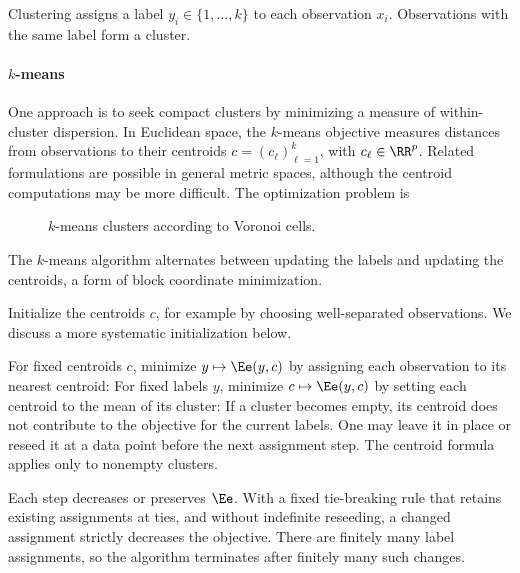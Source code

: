 Clustering assigns a label $y_i \in \{1,\ldots,k\}$ to each observation $x_i$. Observations with the same label form a cluster.

    
\paragraph{\texorpdfstring{$k$}{k}-means}

One approach is to seek compact clusters by minimizing a measure of within-cluster dispersion. In Euclidean space, the $k$-means objective measures distances from observations to their centroids $c=(c_\ell)_{\ell=1}^k$, with $c_\ell \in \RR^p$. Related formulations are possible in general metric spaces, although the centroid computations may be more difficult. The optimization problem is

\begin{figure}[tbp]
\centering
{}
\caption{$k$-means clusters according to Voronoi cells.}
\label{fig-review-ml-voronoi}
\end{figure}
The $k$-means algorithm alternates between updating the labels and updating the centroids, a form of block coordinate minimization.
 
Initialize the centroids $c$, for example by choosing well-separated observations. We discuss a more systematic initialization below.
  
For fixed centroids $c$, minimize $y \mapsto \Ee(y,c)$ by assigning each observation to its nearest centroid:
For fixed labels $y$, minimize $c \mapsto \Ee(y,c)$ by setting each centroid to the mean of its cluster:
If a cluster becomes empty, its centroid does not contribute to the objective for the current labels. One may leave it in place or reseed it at a data point before the next assignment step. The centroid formula applies only to nonempty clusters.

Each step decreases or preserves $\Ee$. With a fixed tie-breaking rule that retains existing assignments at ties, and without indefinite reseeding, a changed assignment strictly decreases the objective. There are finitely many label assignments, so the algorithm terminates after finitely many such changes.

